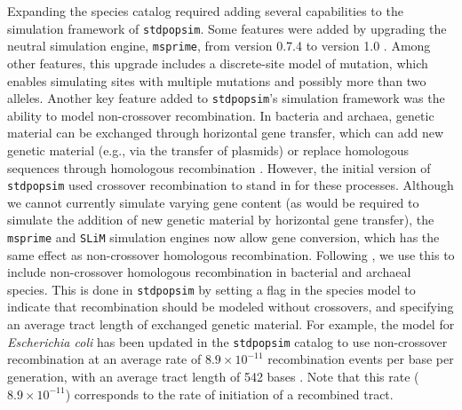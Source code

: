 \documentclass[hidelinks]{article}
\newcommand{\stdpopsim}{\texttt{stdpopsim}\xspace}
\begin{document}
Expanding the species catalog required adding several capabilities to the simulation framework of \stdpopsim.
Some features were added by upgrading the neutral simulation engine, \texttt{msprime}, from version 0.7.4 to version 1.0 \citep{Baumdicker2022}.
Among other features, this upgrade includes a discrete-site model of mutation,
which enables simulating sites with multiple mutations and possibly more than two alleles.
Another key feature added to \stdpopsim's simulation framework was the ability to model non-crossover recombination.
In bacteria and archaea, genetic material can be exchanged through horizontal gene transfer,
which can add new genetic material (e.g., via the transfer of plasmids)
or replace homologous sequences through homologous recombination \citep{Thomas2005,Didelot2010,Gophna2022}.
However, the initial version of \stdpopsim used crossover recombination to stand in for these processes.
Although we cannot currently simulate varying gene content
(as would be required to simulate the addition of new genetic material by horizontal gene transfer),
the \texttt{msprime} and \texttt{SLiM} simulation engines now allow gene conversion,
which has the same effect as non-crossover homologous recombination.
Following \citet{Cury2022}, we use this to include non-crossover homologous recombination in bacterial and archaeal species.
This is done in \stdpopsim by setting a flag in the species model to indicate that recombination should be modeled without crossovers,
and specifying an average tract length of exchanged genetic material.
For example, the model for \textit{Escherichia coli} has been updated in the \stdpopsim catalog to use non-crossover recombination at an average rate of $8.9\times 10^{-11}$ recombination events per base per generation,
with an average tract length of 542 bases \citep{Wielgoss2011,Didelot2012}.
Note that this rate ($8.9\times 10^{-11}$) corresponds to the rate of initiation of a recombined tract.
\end{document}
